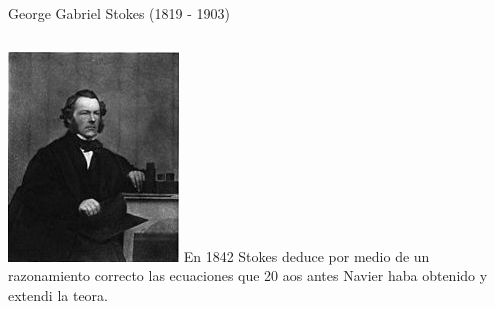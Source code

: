 \documentclass[serif,9pt]{beamer}
\begin{document}
\begin{frame}
\begin{block}{George Gabriel Stokes (1819 - 1903)}
\begin{columns}
 \hspace{0.9cm}
\includegraphics[width=\textwidth]{Stokes} 
En 1842 Stokes deduce por medio de un razonamiento correcto las ecuaciones que 20  aos antes Navier haba obtenido
y extendi la teora. 
\end{columns}
\end{block}

\end{frame}
\end{document}
